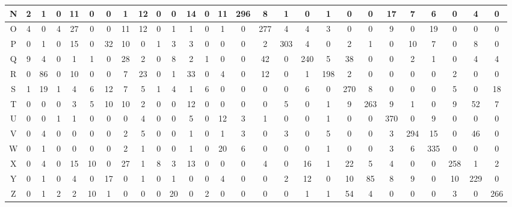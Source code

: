 \documentclass[11pt, oneside]{article}    %
\begin{document}
\begin{landscape}
\begin{tabular}{|c|c|c|c|c|c|c|c|c|c|c|c|c|c|c|c|c|c|c|c|c|c|c|c|c|c|c|}
  N & 2 & 1 & 0 & 11 & 0 & 0 & 1 & 12 & 0 & 0 & 14 & 0 & 11 & 296 & 8 & 1 & 0 & 1 & 0 & 0 & 17 & 7 & 6 & 0 & 4 & 0 \\ \hline
  O & 4 & 0 & 4 & 27 & 0 & 0 & 11 & 12 & 0 & 1 & 1 & 0 & 1 & 0 & 277 & 4 & 4 & 3 & 0 & 0 & 9 & 0 & 19 & 0 & 0 & 0 \\ \hline
  P & 0 & 1 & 0 & 15 & 0 & 32 & 10 & 0 & 1 & 3 & 3 & 0 & 0 & 0 & 2 & 303 & 4 & 0 & 2 & 1 & 0 & 10 & 7 & 0 & 8 & 0 \\ \hline
  Q & 9 & 4 & 0 & 1 & 1 & 0 & 28 & 2 & 0 & 8 & 2 & 1 & 0 & 0 & 42 & 0 & 240 & 5 & 38 & 0 & 0 & 2 & 1 & 0 & 4 & 4 \\ \hline
  R & 0 & 86 & 0 & 10 & 0 & 0 & 7 & 23 & 0 & 1 & 33 & 0 & 4 & 0 & 12 & 0 & 1 & 198 & 2 & 0 & 0 & 0 & 0 & 2 & 0 & 0 \\ \hline
  S & 1 & 19 & 1 & 4 & 6 & 12 & 7 & 5 & 1 & 4 & 1 & 6 & 0 & 0 & 0 & 0 & 6 & 0 & 270 & 8 & 0 & 0 & 0 & 5 & 0 & 18 \\ \hline
  T & 0 & 0 & 0 & 3 & 5 & 10 & 10 & 2 & 0 & 0 & 12 & 0 & 0 & 0 & 0 & 5 & 0 & 1 & 9 & 263 & 9 & 1 & 0 & 9 & 52 & 7 \\ \hline
  U & 0 & 0 & 1 & 1 & 0 & 0 & 0 & 4 & 0 & 0 & 5 & 0 & 12 & 3 & 1 & 0 & 0 & 1 & 0 & 0 & 370 & 0 & 9 & 0 & 0 & 0 \\ \hline
  V & 0 & 4 & 0 & 0 & 0 & 0 & 2 & 5 & 0 & 0 & 1 & 0 & 1 & 3 & 0 & 3 & 0 & 5 & 0 & 0 & 3 & 294 & 15 & 0 & 46 & 0 \\ \hline
  W & 0 & 1 & 0 & 0 & 0 & 0 & 2 & 1 & 0 & 0 & 1 & 0 & 20 & 6 & 0 & 0 & 0 & 1 & 0 & 0 & 3 & 6 & 335 & 0 & 0 & 0 \\ \hline
  X & 0 & 4 & 0 & 15 & 10 & 0 & 27 & 1 & 8 & 3 & 13 & 0 & 0 & 0 & 4 & 0 & 16 & 1 & 22 & 5 & 4 & 0 & 0 & 258 & 1 & 2 \\ \hline
  Y & 0 & 1 & 0 & 4 & 0 & 17 & 0 & 1 & 0 & 1 & 0 & 0 & 4 & 0 & 0 & 2 & 12 & 0 & 10 & 85 & 8 & 9 & 0 & 10 & 229 & 0 \\ \hline
  Z & 0 & 1 & 2 & 2 & 10 & 1 & 0 & 0 & 0 & 20 & 0 & 2 & 0 & 0 & 0 & 0 & 1 & 1 & 54 & 4 & 0 & 0 & 0 & 3 & 0 & 266 \\ \hline
\end{tabular}
\end{landscape}
\endgroup
\end{document}
